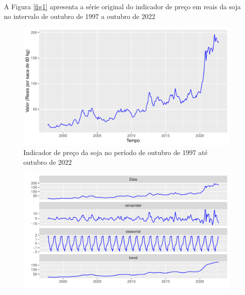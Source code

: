 \documentclass[
	12pt,				%
	openright,			%
	oneside,      %
	a4paper,			%
	english,			%
	french,				%
	spanish,			%
	brazil,				%
	]{abntex2}\usepackage[]{graphicx}\usepackage[table]{xcolor}
\makeatletter
\def\maxwidth{ %
  \ifdim\Gin@nat@width>\linewidth
    \linewidth
  \else
    \Gin@nat@width
  \fi
}
\newenvironment{knitrout}{}{} %
\theoremstyle{definition}
\theoremstyle{remark}
\makeatother
\begin{document}
A Figura \ref{fig1} apresenta a série original do indicador de preço em reais da soja no intervalo de outubro de 1997 a outubro de 2022 

\begin{knitrout}
\color{fgcolor}\begin{figure}[H]
\includegraphics[width=\maxwidth]{figure/script1-1} \caption[Indicador de preço da soja no período de outubro de 1997 até outubro de 2022 \label{fig1}]{Indicador de preço da soja no período de outubro de 1997 até outubro de 2022 \label{fig1}}\label{fig:script1}
\end{figure}

\end{knitrout}


\begin{knitrout}
\color{fgcolor}\begin{figure}
\includegraphics[width=\maxwidth]{figure/script2-1} \end{figure}

\end{knitrout}
\end{document}

